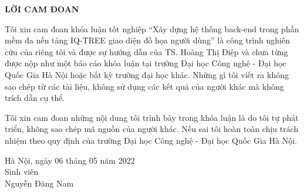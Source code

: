 \documentclass[12pt]{report}
\begin{document}
\newpage
\begin{center}
	\textbf{\large LỜI CAM ĐOAN}
\end{center}

Tôi xin cam đoan khóa luận tốt nghiệp “Xây dựng hệ thống back-end trong phần mềm đa nền tảng IQ-TREE giao diện đồ họa người dùng” là công trình nghiên cứu của riêng tôi và được sự hướng dẫn của TS. Hoàng Thị Điệp và chưa từng được nộp như một báo cáo khóa luận tại trường Đại học Công nghệ - Đại học Quốc Gia Hà Nội hoặc bất kỳ trường đại học khác. Những gì tôi viết ra không sao chép từ các tài liệu, không sử dụng các kết quả của người khác mà không trích dẫn cụ thể.

Tôi xin cam đoan những nội dung tôi trình bày trong khóa luận là do tôi tự phát triển, không sao chép mã nguồn của người khác. Nếu sai tôi hoàn toàn chịu trách nhiệm theo quy định của trường Đại học Công nghệ - Đại học Quốc Gia Hà Nội.

\begin{flushright}
	\begin{varwidth}{\linewidth}\centering
		Hà Nội, ngày 06 tháng 05 năm 2022\\
		Sinh viên\\[2cm]
		Nguyễn Đăng Nam
	\end{varwidth}
\end{flushright}

\newpage
\tableofcontents

\newpage
{}
\listoftables
\end{document}
